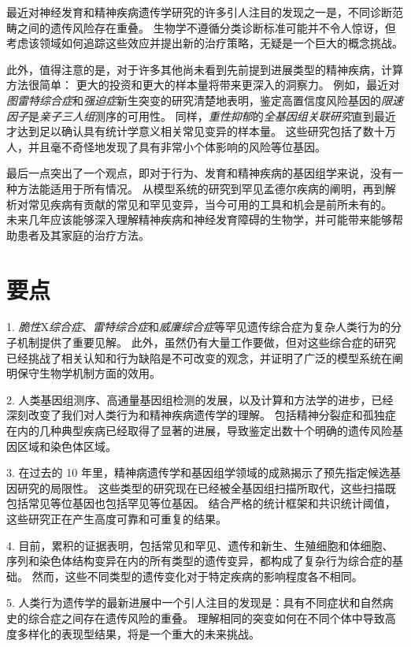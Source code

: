最近对神经发育和精神疾病遗传学研究的许多引人注目的发现之一是，不同诊断范畴之间的遗传风险存在重叠。
生物学不遵循分类诊断标准可能并不令人惊讶，但考虑该领域如何追踪这些效应并提出新的治疗策略，无疑是一个巨大的概念挑战。


此外，值得注意的是，对于许多其他尚未看到先前提到进展类型的精神疾病，计算方法很简单：
更大的投资和更大的样本量将带来更深入的洞察力。 
例如，最近对\textit{图雷特综合症}和\textit{强迫症}新生突变的研究清楚地表明，鉴定高置信度风险基因的\textit{限速因子}是\textit{亲子三人组}测序的可用性。
同样，\textit{重性抑郁}的\textit{全基因组关联研究}直到最近才达到足以确认具有统计学意义相关常见变异的样本量。
这些研究包括了数十万人，并且毫不奇怪地发现了具有非常小个体影响的风险等位基因。


最后一点突出了一个观点，即对于行为、发育和精神疾病的基因组学来说，没有一种方法能适用于所有情况。
从模型系统的研究到罕见孟德尔疾病的阐明，再到解析对常见疾病有贡献的常见和罕见变异，当今可用的工具和机会是前所未有的。
未来几年应该能够深入理解精神疾病和神经发育障碍的生物学，并可能带来能够帮助患者及其家庭的治疗方法。


\section{要点}

1. \textit{脆性}X\textit{综合症}、\textit{雷特综合症}和\textit{威廉综合症}等罕见遗传综合症为复杂人类行为的分子机制提供了重要见解。 
此外，虽然仍有大量工作要做，但对这些综合症的研究已经挑战了相关认知和行为缺陷是不可改变的观念，并证明了广泛的模型系统在阐明保守生物学机制方面的效用。


2. 人类基因组测序、高通量基因组检测的发展，以及计算和方法学的进步，已经深刻改变了我们对人类行为和精神疾病遗传学的理解。
包括精神分裂症和孤独症在内的几种典型疾病已经取得了显著的进展，导致鉴定出数十个明确的遗传风险基因区域和染色体区域。


3. 在过去的 10 年里，精神病遗传学和基因组学领域的成熟揭示了预先指定候选基因研究的局限性。
这些类型的研究现在已经被全基因组扫描所取代，这些扫描既包括常见等位基因也包括罕见等位基因。
结合严格的统计框架和共识统计阈值，这些研究正在产生高度可靠和可重复的结果。


4. 目前，累积的证据表明，包括常见和罕见、遗传和新生、生殖细胞和体细胞、序列和染色体结构变异在内的所有类型的遗传变异，都构成了复杂行为综合症的基础。
然而，这些不同类型的遗传变化对于特定疾病的影响程度各不相同。

5. 
人类行为遗传学的最新进展中一个引人注目的发现是：具有不同症状和自然病史的综合症之间存在遗传风险的重叠。
理解相同的突变如何在不同个体中导致高度多样化的表现型结果，将是一个重大的未来挑战。


